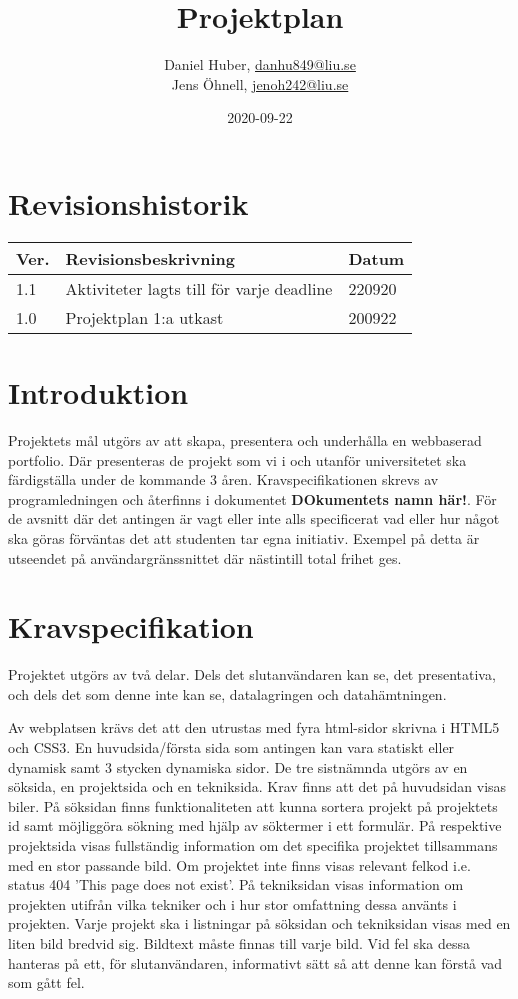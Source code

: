\documentclass{TDP003mall}
\author{Daniel Huber, \url{danhu849@liu.se}\\
  Jens Öhnell, \url{jenoh242@liu.se}}
\title{Projektplan}
\date{2020-09-22}
\begin{document}
\projectpage
\section{Revisionshistorik}
\begin{table}[!h]
\begin{tabularx}{\linewidth}{|l|X|l|}
\hline
Ver. & Revisionsbeskrivning & Datum \\\hline
1.1 & Aktiviteter lagts till för varje deadline & 220920\\\hline
1.0 & Projektplan 1:a utkast & 200922 \\\hline
\end{tabularx}
\end{table}


\section{Introduktion}
Projektets mål utgörs av att skapa, presentera och underhålla en webbaserad portfolio. Där presenteras de projekt som vi i och utanför universitetet ska färdigställa under de kommande 3 åren. Kravspecifikationen skrevs av programledningen och återfinns i dokumentet \textbf{DOkumentets namn här!}. För de avsnitt där det antingen är vagt eller inte alls specificerat vad eller hur något ska göras förväntas det att studenten tar egna initiativ. Exempel på detta är utseendet på användargränssnittet där nästintill total frihet ges.


\section{Kravspecifikation}
Projektet utgörs av två delar. Dels det slutanvändaren kan se, det presentativa, och dels det som denne inte kan se, datalagringen och datahämtningen.

Av webplatsen krävs det att den utrustas med fyra html-sidor skrivna i HTML5 och CSS3. En huvudsida/första sida som antingen kan vara statiskt eller dynamisk samt 3 stycken dynamiska sidor. De tre sistnämnda utgörs av en söksida, en projektsida och en tekniksida. Krav finns att det på huvudsidan visas biler. På söksidan finns funktionaliteten att kunna sortera projekt på projektets id samt möjliggöra sökning med hjälp av söktermer i ett formulär. På respektive projektsida visas fullständig information om det specifika projektet tillsammans med en stor passande bild. Om projektet inte finns visas relevant felkod i.e. status 404 'This page does not exist'. På tekniksidan visas information om projekten utifrån vilka tekniker och i hur stor omfattning dessa använts i projekten. Varje projekt ska i listningar på söksidan och tekniksidan visas med en liten bild bredvid sig. Bildtext måste finnas till varje bild. Vid fel ska dessa hanteras på ett, för slutanvändaren, informativt sätt så att denne kan förstå vad som gått fel.
\end{document}
